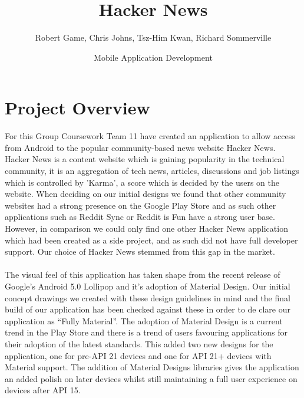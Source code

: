 \documentclass[11pt]{article}
\begin{document}
\title{Hacker News}
\author{Robert Game, Chris Johns, Tsz-Him Kwan, Richard Sommerville}
\date{Mobile Application Development}
\maketitle

\section*{Project Overview}
For this Group Coursework Team 11 have created an application to allow access from Android to the popular community-based news website Hacker News. Hacker News is a content website which is gaining popularity in the technical community, it is an aggregation of tech news, articles, discussions and job listings which is controlled by 'Karma', a score which is decided by the users on the website.  When deciding on our initial designs we found that other community websites had a strong presence on the Google Play Store and as such other applications such as Reddit Sync or Reddit is Fun have a strong user base. However, in comparison we could only find one other Hacker News application which had been created as a side project, and as such did not have full developer support. Our choice of Hacker News stemmed from this gap in the market.
\\
\\
The visual feel of this application has taken shape from the recent release of Google's Android 5.0 Lollipop and it's adoption of Material Design. Our initial concept drawings we created with these design guidelines in mind and the final build of our application has been checked against these in order to de clare our application as “Fully Material”. The adoption of Material Design is a current trend in the Play Store and there is a trend of users favouring applications for their adoption of the latest standards. This added two new designs for the application, one for pre-API 21 devices and one for API 21+ devices with Material support. The addition of Material Designs libraries gives the application an added polish on later devices whilst still maintaining a full user experience on devices after API 15.
\\
\\
\end{document}
